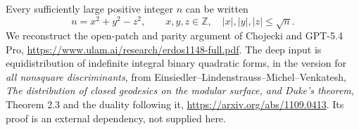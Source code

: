 Every sufficiently large positive integer $n$ can be written
\[
 n=x^2+y^2-z^2,\qquad x,y,z\in\mathbb Z,\quad |x|,|y|,|z|\le\sqrt n.
\]
We reconstruct the open-patch and parity argument of Chojecki and GPT-5.4 Pro, \url{https://www.ulam.ai/research/erdos1148-full.pdf}. The deep input is equidistribution of indefinite integral binary quadratic forms, in the version for \emph{all nonsquare discriminants}, from Einsiedler--Lindenstrauss--Michel--Venkatesh, \emph{The distribution of closed geodesics on the modular surface, and Duke's theorem}, Theorem 2.3 and the duality following it, \url{https://arxiv.org/abs/1109.0413}. Its proof is an external dependency, not supplied here.
